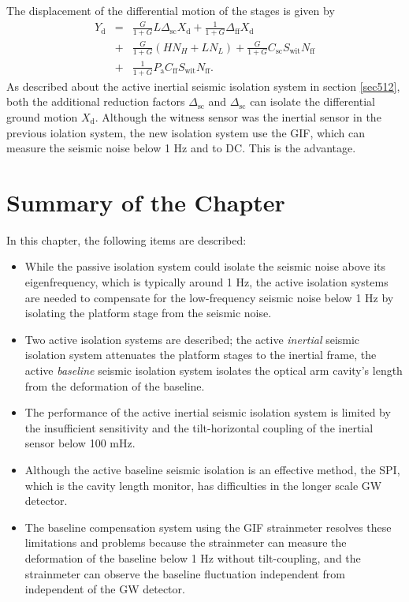 The displacement of the differential motion of the stages is given by 
\begin{eqnarray}\nonumber
  Y_{\mathrm{d}} &=&\frac{G}{1+G}L\Delta_{\mathrm{sc}} X_{\mathrm{d}} + \frac{1}{1+G} \Delta_{\mathrm{ff}} X_{\mathrm{d}}\\ \nonumber
  &+& \frac{G}{1+G}\left(HN_{H}+LN_{L}\right) + \frac{G}{1+G}C_{\mathrm{sc}}S_{\mathrm{wit}}N_{\mathrm{ff}} \\ 
  &+& \frac{1}{1+G}P_{\mathrm{a}} C_{\mathrm{ff}}S_{\mathrm{wit}}N_{\mathrm{ff}} \label{eq:eq520}.
\end{eqnarray}
As described about the active inertial seismic isolation system in section \ref{sec512}, both the additional reduction factors $\Delta_{\mathrm{sc}}$ and $\Delta_{\mathrm{sc}}$ can isolate the differential ground motion $X_{\mathrm{d}}$. Although the witness sensor was the inertial sensor in the previous iolation system, the new isolation system use the GIF, which can measure the seismic noise below 1 Hz and to DC. This is the advantage.

\section{Summary of the Chapter}
In this chapter, the following items are described:
\begin{itemize}
\item While the passive isolation system could isolate the seismic noise above its eigenfrequency, which is typically around 1 Hz, the active isolation systems are needed to compensate for the low-frequency seismic noise below 1 Hz by isolating the platform stage from the seismic noise.
\item Two active isolation systems are described; the active {\it inertial} seismic isolation system attenuates the platform stages to the inertial frame, the active {\it baseline} seismic isolation system isolates the optical arm cavity's length from the deformation of the baseline.
\item The performance of the active inertial seismic isolation system is limited by the insufficient sensitivity and the tilt-horizontal coupling of the inertial sensor below 100 mHz.
\item Although the active baseline seismic isolation is an effective method, the SPI, which is the cavity length monitor, has difficulties in the longer scale GW detector.
\item The baseline compensation system using the GIF strainmeter resolves these limitations and problems because the strainmeter can measure the deformation of the baseline below 1 Hz without tilt-coupling, and the strainmeter can observe the baseline fluctuation independent from independent of the GW detector.
\end{itemize}
